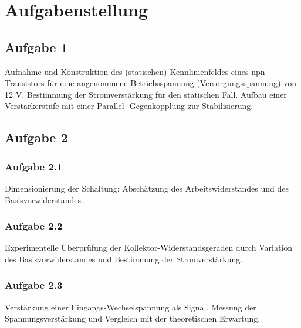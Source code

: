\documentclass{article}
\begin{document}
\newpage
\section{Aufgabenstellung}
\subsection*{Aufgabe 1}
Aufnahme und Konstruktion des (statischen) Kennlinienfeldes eines npn-Transistors für eine
angenommene Betriebsspannung (Versorgungsspannung) von 12 V. Bestimmung der Stromverstärkung für
den statischen Fall. Aufbau einer Verstärkerstufe mit einer Parallel- Gegenkopplung zur
Stabilisierung.

\subsection*{Aufgabe 2}
\subsubsection*{Aufgabe 2.1}
Dimensionierung der Schaltung: Abschätzung des Arbeitswiderstandes und des Basisvorwiderstandes.
\subsubsection*{Aufgabe 2.2}
Experimentelle Überprüfung der Kollektor-Widerstandsgeraden durch Variation des
Basisvorwiderstandes und Bestimmung der Stromverstärkung.
\subsubsection*{Aufgabe 2.3}
Verstärkung einer Eingangs-Wechselspannung als Signal. Messung der Spannungsverstärkung und Vergleich mit der theoretischen Erwartung.

\newpage
\begin{center}
\begin{minipage}{\linewidth}
\centering
{}
%
\label{Schaltplan1}
\end{minipage}
\end{center}
\end{document}
